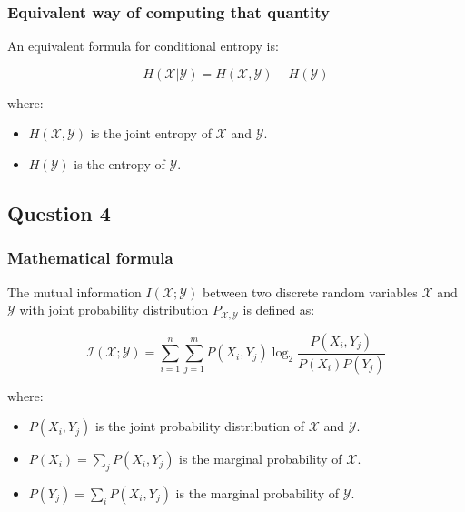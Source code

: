 \documentclass{article}
\begin{document}

\subsubsection*{Equivalent way of computing that quantity}

An equivalent formula for conditional entropy is:

\begin{equation}
\label{eq:conditional_entropy_relation}
H(\mathcal{X} | \mathcal{Y}) = H(\mathcal{X}, \mathcal{Y}) - H(\mathcal{Y})
\end{equation}

where:
\begin{itemize}
    \item $H(\mathcal{X}, \mathcal{Y})$ is the joint entropy of $\mathcal{X}$ and $\mathcal{Y}$.
    \item $H(\mathcal{Y})$ is the entropy of $\mathcal{Y}$.
\end{itemize}

\subsection*{Question 4}

\subsubsection*{Mathematical formula}

The mutual information $I(\mathcal{X};\mathcal{Y})$ between two discrete random variables $\mathcal{X}$ and $\mathcal{Y}$ with joint probability distribution $P_{\mathcal{X},\mathcal{Y}}$ is defined as:

\begin{equation}
\mathcal{I(\mathcal{X};\mathcal{Y})} = \sum_{i=1}^{n} \sum_{j=1}^{m} P(X_i, Y_j) \log_2 \frac{P(X_i, Y_j)}{P(X_i) P(Y_j)}
\end{equation}

where:
\begin{itemize}
    \item $P(X_i, Y_j)$ is the joint probability distribution of $\mathcal{X}$ and $\mathcal{Y}$.
    \item $P(X_i) = \sum_{j} P(X_i, Y_j)$ is the marginal probability of $\mathcal{X}$.
    \item $P(Y_j) = \sum_{i} P(X_i, Y_j)$ is the marginal probability of $\mathcal{Y}$.
\end{itemize}
\end{document}
